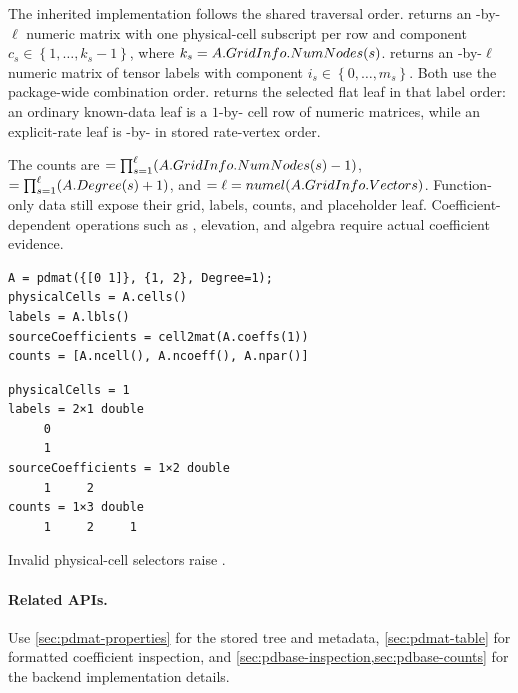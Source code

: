 \descriptionhead
The inherited implementation follows the shared  traversal order.  returns an -by-$\ell$ numeric matrix with one physical-cell subscript per row and component $c_s\in\left\{1,\ldots,k_s-1\right\}$, where $k_s=A.GridInfo.NumNodes(s)$.  returns an -by-$\ell$ numeric matrix of tensor labels with component $i_s\in\left\{0,\ldots,m_s\right\}$. Both use the package-wide combination order.  returns the selected flat leaf in that label order: an ordinary known-data leaf is a $1$-by- cell row of numeric matrices, while an explicit-rate leaf is -by- in stored rate-vertex order.

The counts are $=\prod_{s=1}^{\ell}(A.GridInfo.NumNodes(s)-1)$, $=\prod_{s=1}^{\ell}(A.Degree(s)+1)$, and $=\ell=numel(A.GridInfo.Vectors)$. Function-only data still expose their grid, labels, counts, and placeholder leaf. Coefficient-dependent operations such as , elevation, and algebra require actual coefficient evidence.

\examplehead
\begin{lstlisting}[style=dpmatlab]
A = pdmat({[0 1]}, {1, 2}, Degree=1);
physicalCells = A.cells()
labels = A.lbls()
sourceCoefficients = cell2mat(A.coeffs(1))
counts = [A.ncell(), A.ncoeff(), A.npar()]
\end{lstlisting}
\begin{lstlisting}[style=dpoutput]
physicalCells = 1
labels = 2×1 double
     0
     1
sourceCoefficients = 1×2 double
     1     2
counts = 1×3 double
     1     2     1
\end{lstlisting}

\remarkshead
Invalid physical-cell selectors raise .

\paragraph{Related APIs.}
Use \cref{sec:pdmat-properties} for the stored tree and metadata, \cref{sec:pdmat-table} for formatted coefficient inspection, and \cref{sec:pdbase-inspection,sec:pdbase-counts} for the backend implementation details.

\section{\texorpdfstring{}{evaluate}}
\label{sec:pdmat-evaluate}

